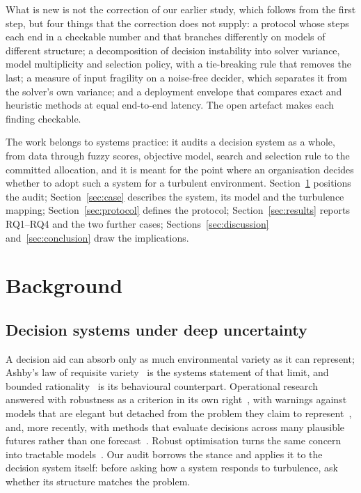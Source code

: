 \documentclass[systems,article,submit,moreauthors,pdftex]{Definitions/mdpi}
\begin{document}
What is new is not the correction of our earlier study, which follows from the first step, but
four things that the correction does not supply: a protocol whose steps each end in a
checkable number and that branches differently on models of different structure; a
decomposition of decision instability into solver variance, model multiplicity and selection
policy, with a tie-breaking rule that removes the last; a measure of input fragility on a
noise-free decider, which separates it from the solver's own variance; and a deployment
envelope that compares exact and heuristic methods at equal end-to-end latency. The open
artefact makes each finding checkable.

The work belongs to systems practice: it audits a decision system as a whole, from data
through fuzzy scores, objective model, search and selection rule to the committed allocation,
and it is meant for the point where an organisation decides whether to adopt such a system
for a turbulent environment. Section~\ref{sec:background} positions the audit;
Section~\ref{sec:case} describes the system, its model and the turbulence mapping;
Section~\ref{sec:protocol} defines the protocol; Section~\ref{sec:results} reports RQ1--RQ4
and the two further cases; Sections~\ref{sec:discussion} and~\ref{sec:conclusion} draw the
implications.

\section{Background}\label{sec:background}

\subsection{Decision systems under deep uncertainty}
A decision aid can absorb only as much environmental variety as it can represent; Ashby's
law of requisite variety~\cite{ashby1956cybernetics} is the systems statement of that
limit, and bounded rationality~\cite{simon1955behavioral} is its behavioural counterpart.
Operational research answered with robustness as a criterion in its own
right~\cite{rosenhead1972robustness}, with warnings against models that are elegant but
detached from the problem they claim to represent~\cite{ackoff1979future}, and, more
recently, with methods that evaluate decisions across many plausible futures rather than
one forecast~\cite{lempert2006robust,walker2003uncertainty,marchau2019deep}. Robust
optimisation turns the same concern into tractable models~\cite{bental2002robust,bertsimas2004price}.
Our audit borrows the stance and applies it to the decision system itself: before asking
how a system responds to turbulence, ask whether its structure matches the problem.
\end{document}
